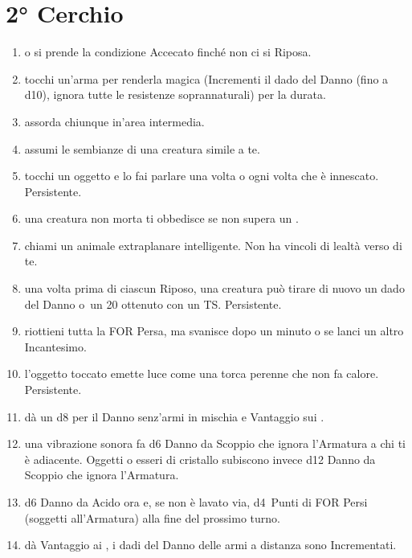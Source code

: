 \documentclass[itdr]{subfiles}
\begin{document}

\vfill
\break

\section{2° Cerchio}
\def \spellcircle {2}
\begin{enumerate}
	\item {}  o si prende la condizione Accecato finché non ci si Riposa.
	\item {} tocchi un'arma per renderla magica (Incrementi il dado del Danno (fino a d10), ignora tutte le resistenze soprannaturali) per la durata.
	\item {} assorda chiunque in'area intermedia.
	\item {} assumi le sembianze di una creatura simile a te.
	\item {} tocchi un oggetto e lo fai parlare una volta o ogni volta che è innescato. Persistente.
	\item {} una creatura non morta ti obbedisce se non supera un .
	\item {} chiami un animale extraplanare intelligente. Non ha vincoli di lealtà verso di te.
	\item {} una volta prima di ciascun Riposo, una creatura può tirare di nuovo un dado del Danno o~un 20 ottenuto con un TS. Persistente.
	\item {} riottieni tutta la FOR Persa, ma svanisce dopo un minuto o se lanci un altro Incantesimo.
	\item {} l'oggetto toccato emette luce come una torca perenne che non fa calore. Persistente.
	\item {} dà un d8 per il Danno senz'armi in mischia e Vantaggio sui .
	\item {} una vibrazione sonora fa d6 Danno da Scoppio che ignora l'Armatura a chi ti è adiacente. Oggetti o esseri di cristallo subiscono invece d12 Danno da Scoppio che ignora l'Armatura.
	\item {} d6 Danno da Acido ora e, se non è lavato via, d4~Punti di FOR Persi (soggetti all'Armatura) alla fine del prossimo turno.
	\item {} dà Vantaggio ai , i dadi del Danno delle armi a distanza sono Incrementati.

\end{enumerate}
\end{document}
